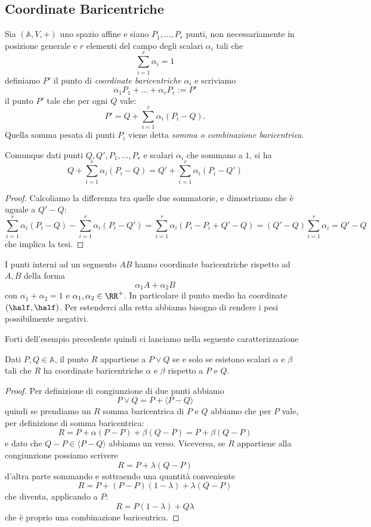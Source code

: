 \documentclass[11pt]{scrartcl}
\begin{document}
   	 \subsection{Coordinate Baricentriche}
   	 \begin{definition}
   	 	Sia $(\mathbb{A},V,+)$ uno spazio affine e siano $P_1,\dots, P_r$ punti, non necessariamente in posizione generale e $r$ elementi del campo degli scalari $\alpha_i$ tali che
   	 	$$\sum_{i=1}^{r}\alpha_i=1$$ 
   	 	definiamo $P'$ il punto di \textit{coordinate baricentriche} $\alpha_i$ e scriviamo
   	 	$$\alpha_1P_1+\dots+\alpha_rP_r:=P'$$
   	 	il punto $P'$ tale che per ogni $Q$ vale:
   	 	$$P'=Q+\sum_{i=1}^r \alpha_i(P_i-Q).$$
   	 	Quella somma pesata di punti $P_i$ viene detta \textit{somma o combinazione baricentrica}.
   	 \end{definition}
   	 \begin{proposition}
   	 	Comunque dati punti $Q,Q',P_1,\dots,P_r$ e scalari $\alpha_i$ che sommano a $1$, si ha
   	 	$$Q+\sum_{i=1}^{r}\alpha_i(P_i-Q)=Q'+\sum_{i=1}^{r}\alpha_i(P_i-Q')$$
   	 \end{proposition}
   	 \begin{proof}
   	 	Calcoliamo la differenza tra quelle due sommatorie, e dimostriamo che è uguale a $Q'-Q$:
   	 	$$\sum_{i=1}^{r}\alpha_i(P_i-Q)-\sum_{i=1}^{r}\alpha_i(P_i-Q')=\sum_{i=1}^{r}\alpha_i(P_i-P_i+Q'-Q)=(Q'-Q)\sum_{i=1}^{r}\alpha_i=Q'-Q$$
   	 	che implica la tesi.
   	 \end{proof}
   	 \begin{example}
   	 	I punti interni ad un segmento $AB$ hanno coordinate baricentriche rispetto ad $A,B$ della forma
   	 	$$\alpha_1A+\alpha_2B$$
   	 	con $\alpha_1+\alpha_2=1$ e $\alpha_1,\alpha_2\in\RR^+$. In particolare il punto medio ha coordinate $\left(\half,\half\right)$. Per estenderci alla retta abbiamo bisogno di rendere i pesi possibilmente negativi.
   	 \end{example}
   	 Forti dell'esempio precedente quindi ci lanciamo nella seguente caratterizzazione
   	 \begin{lemma}
   	 	Dati $P,Q\in\mathbb{A}$, il punto $R$ appartiene a $P\lor Q$ se e solo se esistono scalari $\alpha$ e $\beta$ tali che $R$ ha coordinate baricentriche $\alpha$ e $\beta$ rispetto a $P$ e $Q$. 
   	 \end{lemma}
   	 \begin{proof}
   	 	Per definizione di congiunzione di due punti abbiamo
   	 	$$P\lor Q = P+\langle P-Q\rangle$$
   	 	quindi se prendiamo un $R$ somma baricentrica di $P$ e $Q$ abbiamo che per $P$ vale, per definizione di somma baricentrica:
   	 	$$R=P+\alpha(P-P)+\beta(Q-P)=P+\beta(Q-P)$$
   	 	e dato che $Q-P\in \langle P-Q\rangle$ abbiamo un verso. Viceversa, se $R$ appartiene alla congiunzione possiamo scrivere 
   	 	$$R=P+\lambda(Q-P)$$
   	 	d'altra parte sommando e sottraendo una quantità conveniente
   	 	$$R=P+(P-P)(1-\lambda)+\lambda(Q-P)$$
   	 	che diventa, applicando a $P$:
   	 	$$R=P(1-\lambda)+Q\lambda$$
   	 	che è proprio una combinazione baricentrica.
   	 \end{proof}
\end{document}
